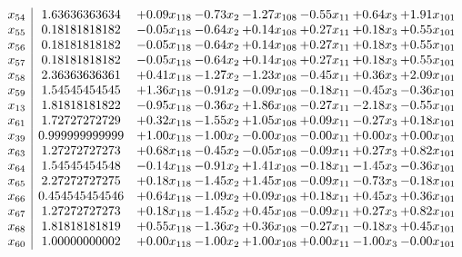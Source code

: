\documentclass[8pt]{article}
\begin{document}
\[\begin{array}{c| c c@{\hskip 2pt} c@{\hskip 2pt} c@{\hskip 2pt} c@{\hskip 2pt} c@{\hskip 2pt} c@{\hskip 2pt} }
 x_{54}   &  1.63636363634 & +  0.09 x_{118} & -0.73 x_{2} & -1.27 x_{108} & -0.55 x_{11} & +  0.64 x_{3} & +  1.91 x_{101}\\
 x_{55}   &  0.18181818182 & -0.05 x_{118} & -0.64 x_{2} & +  0.14 x_{108} & +  0.27 x_{11} & +  0.18 x_{3} & +  0.55 x_{101}\\
 x_{56}   &  0.18181818182 & -0.05 x_{118} & -0.64 x_{2} & +  0.14 x_{108} & +  0.27 x_{11} & +  0.18 x_{3} & +  0.55 x_{101}\\
 x_{57}   &  0.18181818182 & -0.05 x_{118} & -0.64 x_{2} & +  0.14 x_{108} & +  0.27 x_{11} & +  0.18 x_{3} & +  0.55 x_{101}\\
 x_{58}   &  2.36363636361 & +  0.41 x_{118} & -1.27 x_{2} & -1.23 x_{108} & -0.45 x_{11} & +  0.36 x_{3} & +  2.09 x_{101}\\
 x_{59}   &  1.54545454545 & +  1.36 x_{118} & -0.91 x_{2} & -0.09 x_{108} & -0.18 x_{11} & -0.45 x_{3} & -0.36 x_{101}\\
 x_{13}   &  1.81818181822 & -0.95 x_{118} & -0.36 x_{2} & +  1.86 x_{108} & -0.27 x_{11} & -2.18 x_{3} & -0.55 x_{101}\\
 x_{61}   &  1.72727272729 & +  0.32 x_{118} & -1.55 x_{2} & +  1.05 x_{108} & +  0.09 x_{11} & -0.27 x_{3} & +  0.18 x_{101}\\
 x_{39}   &  0.999999999999 & +  1.00 x_{118} & -1.00 x_{2} & -0.00 x_{108} & -0.00 x_{11} & +  0.00 x_{3} & +  0.00 x_{101}\\
 x_{63}   &  1.27272727273 & +  0.68 x_{118} & -0.45 x_{2} & -0.05 x_{108} & -0.09 x_{11} & +  0.27 x_{3} & +  0.82 x_{101}\\
 x_{64}   &  1.54545454548 & -0.14 x_{118} & -0.91 x_{2} & +  1.41 x_{108} & -0.18 x_{11} & -1.45 x_{3} & -0.36 x_{101}\\
 x_{65}   &  2.27272727275 & +  0.18 x_{118} & -1.45 x_{2} & +  1.45 x_{108} & -0.09 x_{11} & -0.73 x_{3} & -0.18 x_{101}\\
 x_{66}   &  0.454545454546 & +  0.64 x_{118} & -1.09 x_{2} & +  0.09 x_{108} & +  0.18 x_{11} & +  0.45 x_{3} & +  0.36 x_{101}\\
 x_{67}   &  1.27272727273 & +  0.18 x_{118} & -1.45 x_{2} & +  0.45 x_{108} & -0.09 x_{11} & +  0.27 x_{3} & +  0.82 x_{101}\\
 x_{68}   &  1.81818181819 & +  0.55 x_{118} & -1.36 x_{2} & +  0.36 x_{108} & -0.27 x_{11} & -0.18 x_{3} & +  0.45 x_{101}\\
 x_{60}   &  1.00000000002 & +  0.00 x_{118} & -1.00 x_{2} & +  1.00 x_{108} & +  0.00 x_{11} & -1.00 x_{3} & -0.00 x_{101}\\

\end{array}\]
\end{document}
